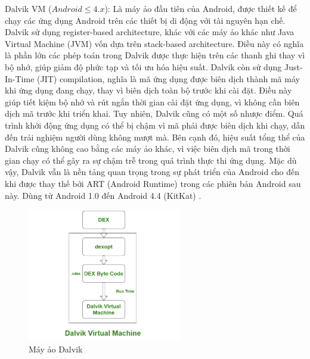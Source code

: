   \vspace{0.5em}

  Dalvik VM ($Android \leq 4.x$): Là máy ảo đầu tiên của Android,  được thiết kế để chạy các ứng dụng Android trên các thiết bị di động với tài nguyên hạn chế. Dalvik sử dụng register-based architecture, khác với các máy ảo khác như Java Virtual Machine (JVM) vốn dựa trên stack-based architecture. Điều này có nghĩa là phần lớn các phép toán trong Dalvik được thực hiện trên các thanh ghi thay vì bộ nhớ, giúp giảm độ phức tạp và tối ưu hóa hiệu suất. Dalvik còn sử dụng Just-In-Time (JIT) compilation, nghĩa là mã ứng dụng được biên dịch thành mã máy khi ứng dụng đang chạy, thay vì biên dịch toàn bộ trước khi cài đặt. Điều này giúp tiết kiệm bộ nhớ và rút ngắn thời gian cài đặt ứng dụng, vì không cần biên dịch mã trước khi triển khai. Tuy nhiên, Dalvik cũng có một số nhược điểm. Quá trình khởi động ứng dụng có thể bị chậm vì mã phải được biên dịch khi chạy, dẫn đến trải nghiệm người dùng không mượt mà. Bên cạnh đó, hiệu suất tổng thể của Dalvik cũng không cao bằng các máy ảo khác, vì việc biên dịch mã trong thời gian chạy có thể gây ra sự chậm trễ trong quá trình thực thi ứng dụng. Mặc dù vậy, Dalvik vẫn là nền tảng quan trọng trong sự phát triển của Android cho đến khi được thay thế bởi ART (Android Runtime) trong các phiên bản Android sau này.
  Dùng từ Android 1.0 đến Android 4.4 (KitKat) \cite{art-dalvik}.
  \begin{figure}[H] 
    \centering
    \includegraphics[width=0.6\textwidth]{images/DalvikVM.png}
    \caption{Máy ảo Dalvik}
    \label{fig:android}
\end{figure}  

